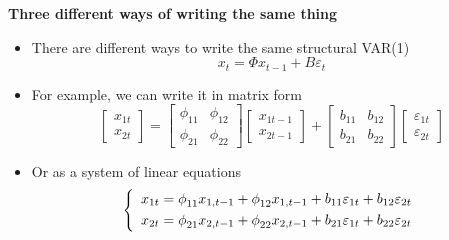 \begin{frame}
{\textbf{Three different ways of writing the same thing}}\smallskip

\begin{itemize}
\item There are different ways to write the same structural VAR(1)%
\begin{equation*}
x_{t}=\Phi x_{t-1}+B\varepsilon _{t}
\end{equation*}%
\pause\vspace{-0.3cm}

\item For example, we can write it in matrix form%
\begin{equation*}
\begin{bmatrix}
x_{1t} \\ 
x_{2t}%
\end{bmatrix}%
=\left[ 
\begin{array}{cc}
\phi _{11} & \phi _{12} \\ 
\phi _{21} & \phi _{22}%
\end{array}%
\right] 
\begin{bmatrix}
x_{1t-1} \\ 
x_{2t-1}%
\end{bmatrix}%
+\left[ 
\begin{array}{cc}
b_{11} & b_{12} \\ 
b_{21} & b_{22}%
\end{array}%
\right] 
\begin{bmatrix}
\varepsilon _{1t} \\ 
\varepsilon _{2t}%
\end{bmatrix}%
\end{equation*}%
\pause

\item Or as a system of linear equations%
\begin{equation*}
\left\{ 
\begin{array}{l}
x_{1t}=\phi _{11}x_{1,t-1}+\phi _{12}x_{1,t-1}+b_{11}\varepsilon
_{1t}+b_{12}\varepsilon _{2t}\smallskip \\ 
x_{2t}=\phi _{21}x_{2,t-1}+\phi _{22}x_{2,t-1}+b_{21}\varepsilon
_{1t}+b_{22}\varepsilon _{2t}%
\end{array}%
\right.
\end{equation*}
\end{itemize}
\end{frame}


